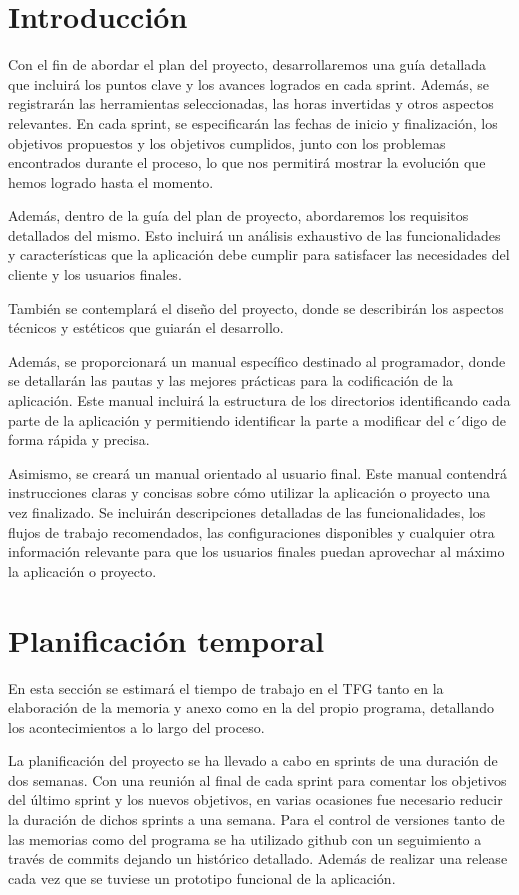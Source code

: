 
\section{Introducción}
Con el fin de abordar el plan del proyecto, desarrollaremos una guía detallada que incluirá los puntos clave y los avances logrados en cada sprint. Además, se registrarán las herramientas seleccionadas, las horas invertidas y otros aspectos relevantes. En cada sprint, se especificarán las fechas de inicio y finalización, los objetivos propuestos y los objetivos cumplidos, junto con los problemas encontrados durante el proceso, lo que nos permitirá mostrar la evolución que hemos logrado hasta el momento.

Además, dentro de la guía del plan de proyecto, abordaremos los requisitos detallados del mismo. Esto incluirá un análisis exhaustivo de las funcionalidades y características que la aplicación debe cumplir para satisfacer las necesidades del cliente y los usuarios finales.

También se contemplará el diseño del proyecto, donde se describirán los aspectos técnicos y estéticos que guiarán el desarrollo.

Además, se proporcionará un manual específico destinado al programador, donde se detallarán las pautas y las mejores prácticas para la codificación de la aplicación. Este manual incluirá la estructura de los directorios identificando cada parte de la aplicación y permitiendo identificar la parte a modificar del c´digo de forma rápida y precisa.

Asimismo, se creará un manual orientado al usuario final. Este manual contendrá instrucciones claras y concisas sobre cómo utilizar la aplicación o proyecto una vez finalizado. Se incluirán descripciones detalladas de las funcionalidades, los flujos de trabajo recomendados, las configuraciones disponibles y cualquier otra información relevante para que los usuarios finales puedan aprovechar al máximo la aplicación o proyecto.
\section{Planificación temporal}
En esta sección se estimará el tiempo de trabajo en el TFG tanto en la elaboración de la memoria y anexo como en la del propio programa, detallando los acontecimientos a lo largo del proceso.

La planificación del proyecto se ha llevado a cabo en sprints de una duración de dos semanas. Con una reunión al final de cada sprint para comentar los objetivos del último sprint y los nuevos objetivos, en varias ocasiones fue necesario reducir la duración de dichos sprints a una semana. Para el control de versiones tanto de las memorias como del programa se ha utilizado github con un seguimiento a través de commits dejando un histórico detallado. Además de realizar una release cada vez que se tuviese un prototipo funcional de la aplicación.

